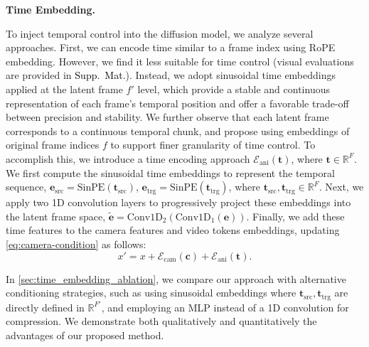 \documentclass[10pt,twocolumn,letterpaper]{article}
\newcommand{\myparagraph}[1]{%
  \vspace{-0.05em}%
  \par\addvspace{0.4em}%
  \noindent\textbf{#1}\hspace{0.4em}%
}
\newcommand{\nameCOLOR}[1]{\textcolor{black}{#1}}
\newcommand{\suppmat}{\nameCOLOR{\mbox{Supp.~Mat.}}\xspace}
\newcommand{\src}{\text{src}}
\newcommand{\trg}{\text{trg}}
\newcommand{\camera}{\mathbf{c}}
\newcommand{\animatime}{\mathbf{t}}
\newcommand{\camencoder}{\mathcal{E}_\text{cam}}
\newcommand{\animaencoder}{\mathcal{E}_\text{ani}}
\newcommand{\todo}[1]{{\color{black}#1}}
\begin{document}
\myparagraph{Time Embedding.}
To inject temporal control into the diffusion model, we analyze several approaches. 
First, we can encode time similar to a frame index using RoPE embedding. 
However, we find it less suitable for time control (\todo{visual evaluations are provided in \suppmat}).
Instead, we adopt sinusoidal time embeddings applied at the latent frame $f'$ level, which provide a stable and continuous representation of each frame’s temporal position and offer a favorable trade-off between precision and stability. 
We further observe that each latent frame corresponds to a continuous temporal chunk, and propose using embeddings of original frame indices $f$ to support finer granularity of time control. 
To accomplish this, we introduce a time encoding approach $\animaencoder(\animatime)$, where $\animatime \in \mathbb{R}^F$. 
We first compute the sinusoidal time embeddings to represent the temporal sequence, $\mathbf{e}_\src = \mathrm{SinPE}\!\left(\animatime_\src\right)$, $\mathbf{e}_\trg = \mathrm{SinPE}\!\left(\animatime_\trg\right)$, where  $\animatime_\src, \animatime_\trg \in \mathbb{R}^F$.
Next, we apply two 1D convolution layers to progressively project these embeddings into the latent frame space, $\widetilde{\mathbf{e}} = \mathrm{Conv1D_2}(\mathrm{Conv1D_1}(\mathbf{e}))$.
Finally, we add these time features to the camera features and video tokens embeddings, updating \cref{eq:camera-condition} as follows:
\begin{equation}
    x' = x + \camencoder\left(\camera\right) + \animaencoder\left(\animatime\right).
    \label{eq:cam-and-ani-condition}
\end{equation}

In \cref{sec:time_embedding_ablation}, we compare our approach with alternative conditioning strategies, such as using sinusoidal embeddings where $\animatime_\src,\animatime_\trg$ are directly defined in $\mathbb{R}^{F'}$, and employing an MLP instead of a 1D convolution for compression. We demonstrate both qualitatively and quantitatively the advantages of our proposed method.
\end{document}

